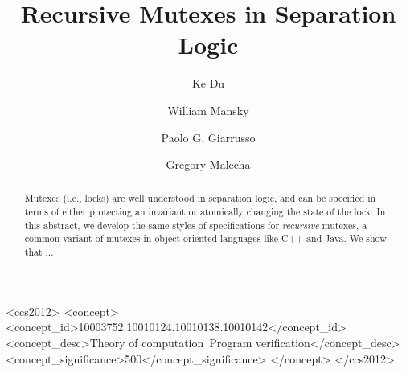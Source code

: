 \documentclass[sigplan,screen]{acmart}
\begin{document}
\title{Recursive Mutexes in Separation Logic}

\author{Ke Du}

\author{William Mansky}

\author{Paolo G. Giarrusso}

\author{Gregory Malecha}

\renewcommand{\shortauthors}{Du et al.}

\newcommand{\mutexR}{\ensuremath{\mathsf{rmutex}}}

\begin{abstract}
Mutexes (i.e., locks) are well understood in separation logic, and can be specified in terms of either protecting an invariant or atomically changing the state of the lock. In this abstract, we develop the same styles of specifications for \emph{recursive} mutexes, a common variant of mutexes in object-oriented languages like C++ and Java. We show that ...
\end{abstract}

\begin{CCSXML}
<ccs2012>
<concept>
<concept_id>10003752.10010124.10010138.10010142</concept_id>
<concept_desc>Theory of computation~Program verification</concept_desc>
<concept_significance>500</concept_significance>
</concept>
</ccs2012>
\end{CCSXML}
\end{document}
